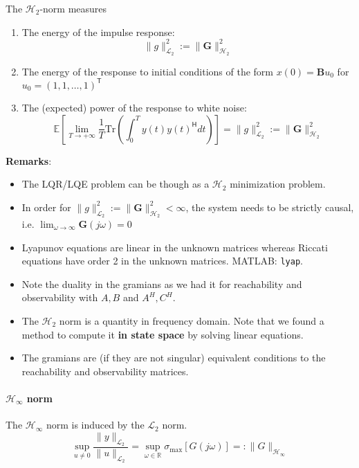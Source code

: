 The $\mathcal{H}_2$-norm measures
\begin{enumerate}
    \item The energy of the impulse response:
          \noindent\begin{equation*}
              \|g\|_{\mathcal{L}_2}^2:= \|\mathbf{G}\|_{\mathcal{H}_2}^2
          \end{equation*}
    \item The energy of the response to initial conditions of the form $x(0)=\mathbf{B}u_0$ for $u_0={(1,1,\ldots, 1)}^{\mathsf{T}}$
    \item The (expected) power of the response to white noise:
          \noindent\begin{equation*}
              \mathbb{E}\left[\lim_{T\to+\infty}\frac{1}{T}\text{Tr}\left(\int_0^T y(t){y(t)}^{\mathsf{H}} dt\right)\right] =  \|g\|_{\mathcal{L}_2}^2:= \|\mathbf{G}\|_{\mathcal{H}_2}^2
          \end{equation*}
\end{enumerate}
\textbf{Remarks}:
\begin{itemize}
    \item The LQR/LQE problem can be though as a $\mathcal{H}_2$ minimization problem.
    \item In order for $\|g\|_{\mathcal{L}_2}^2:= \|\mathbf{G}\|_{\mathcal{H}_2}^2<\infty$, the system needs to be strictly causal, i.e. $\lim_{\omega\to\infty}\mathbf{G}(j\omega)=0$
    \item Lyapunov equations are linear in the unknown matrices whereas Riccati equations have order 2 in the unknown matrices. MATLAB: \texttt{lyap}.
    \item Note the duality in the gramians as we had it for reachability and observability with $A,B$ and $A^H,C^H$.
    \item The $\mathcal{H}_2$ norm is a quantity in frequency domain. Note that we found a method to compute it \textbf{in state space} by solving linear equations.
    \item The gramians are (if they are not singular) equivalent conditions to the reachability and observability matrices.
\end{itemize}

\paragraph[Hinf Norm]{$\mathcal{H}_{\infty}$ norm}
The $\mathcal{H}_{\infty}$ norm is induced by the $\mathcal{L}_2$ norm.
\noindent\begin{equation*}
    \sup_{u\neq0}\frac{\|y\|_{\mathcal{L}_2}}{\|u\|_{\mathcal{L}_2}}=\sup_{\omega\in\mathbb{R}}\sigma_{\max}[G(j\omega)]=:\|G\|_{\mathcal{H}_\infty}
\end{equation*}

